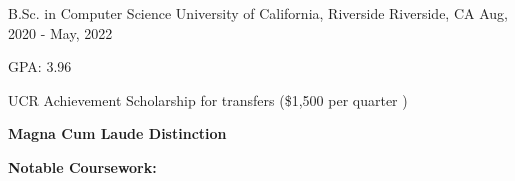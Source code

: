 
\begin{cventries}
  \cventry
    {B.Sc. in Computer Science} %
    {University of California, Riverside} %
    {Riverside, CA} %
    {Aug, 2020 -  May, 2022} %
    {
      \begin{cvitems} %
        \item {GPA: 3.96}
        \item {UCR Achievement Scholarship for transfers (\$1,500 per quarter )}
        \item \textbf{Magna Cum Laude Distinction}
        \item [] \textbf{Notable Coursework:}
             \\
      \end{cvitems}
    }
\end{cventries}
